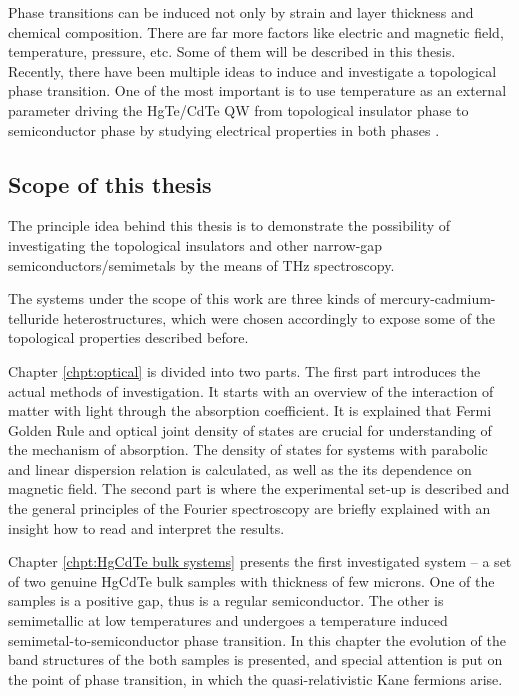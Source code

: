 \documentclass[titlepage,a4paper]{book}
\newcommand{\wciecie}{\quad\phantom{v}}
\begin{document}
Phase transitions can be induced not only by strain and layer thickness and chemical composition. There are far more factors like electric and magnetic field, temperature, pressure, etc. Some of them will be described in this thesis. Recently, there have been multiple ideas to induce and investigate a topological phase transition. One of the most important is to use temperature as an external parameter driving the HgTe/CdTe QW from topological insulator phase to semiconductor phase by studying electrical properties in both phases \cite{Wiedmann_State}. 

\subsection{Scope of this thesis}
\wciecie
The principle idea behind this thesis is to demonstrate the possibility of investigating the topological insulators and other narrow-gap semiconductors/semimetals by the means of THz spectroscopy. 

The systems under the scope of this work are three kinds of mercury-cadmium-telluride heterostructures, which were chosen accordingly to expose some of the topological properties described before.

Chapter \ref{chpt:optical} is divided into two parts. The first part introduces the actual methods of investigation. It starts with an overview of the interaction of matter with light through the absorption coefficient. It is explained that Fermi Golden Rule and optical joint density of states are crucial for understanding of the mechanism of absorption. The density of states for systems with parabolic and linear dispersion relation is calculated, as well as the its dependence on magnetic field. The second part is where the experimental set-up is described and the general principles of the Fourier spectroscopy are briefly explained with an insight how to read and interpret the results.  

Chapter \ref{chpt:HgCdTe bulk systems} presents the first investigated system -- a set of two genuine HgCdTe bulk samples with thickness of few microns. One of the samples is a positive gap, thus is a regular semiconductor. The other is semimetallic at low temperatures and undergoes a temperature induced semimetal-to-semiconductor phase transition. In this chapter the evolution of the band structures of the both samples is presented, and special attention is put on the point of phase transition, in which the quasi-relativistic Kane fermions arise.   
\end{document}
